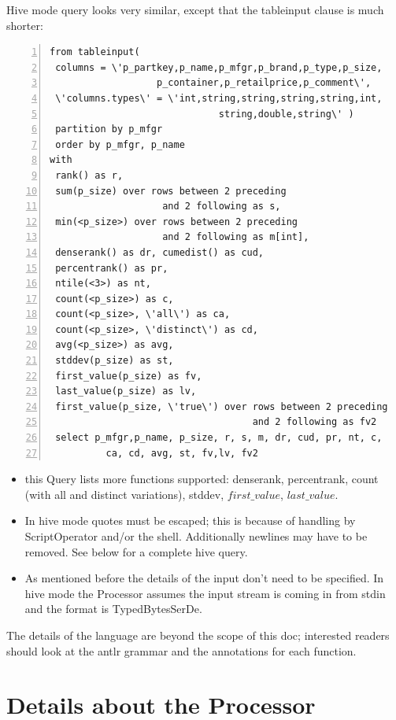 \documentclass[pdftex,10pt,a4paper]{article}
\begin{document}
  
  Hive mode query looks very similar, except that the tableinput clause is much shorter:
  {\small
   \lstset{keywordstyle=\bfseries\underbar, emphstyle=\underbar,
     language=SQL, showspaces=false, showstringspaces=false}
   \begin{lstlisting}[caption={A Hive mode Query},frame=shadowbox, numbers=left]
from tableinput(
 columns = \'p_partkey,p_name,p_mfgr,p_brand,p_type,p_size,
                   p_container,p_retailprice,p_comment\',
 \'columns.types\' = \'int,string,string,string,string,int,
                              string,double,string\' )
 partition by p_mfgr 
 order by p_mfgr, p_name 
with 
 rank() as r, 
 sum(p_size) over rows between 2 preceding 
                    and 2 following as s, 
 min(<p_size>) over rows between 2 preceding 
                    and 2 following as m[int], 
 denserank() as dr, cumedist() as cud, 
 percentrank() as pr, 
 ntile(<3>) as nt, 
 count(<p_size>) as c, 
 count(<p_size>, \'all\') as ca, 
 count(<p_size>, \'distinct\') as cd, 
 avg(<p_size>) as avg, 
 stddev(p_size) as st, 
 first_value(p_size) as fv, 
 last_value(p_size) as lv, 
 first_value(p_size, \'true\') over rows between 2 preceding 
                                    and 2 following as fv2 
 select p_mfgr,p_name, p_size, r, s, m, dr, cud, pr, nt, c, 
          ca, cd, avg, st, fv,lv, fv2
   \end{lstlisting}
   }
  
   \begin{itemize}
   \item this Query lists more functions supported: denserank, percentrank, count (with all and distinct variations), stddev, $first\_value$, $last\_value$.
   \item In hive mode quotes must be escaped; this is because of handling by ScriptOperator and/or the shell. Additionally newlines may have to be removed. See below for a complete hive query.
   \item As mentioned before the details of the input don't need to be specified. In hive mode the Processor assumes the input stream is coming in from stdin and the format is TypedBytesSerDe.
   \end{itemize}
   
   The details of the language are beyond the scope of this doc; interested readers should look at the antlr grammar and the annotations for each function.
   
   \section{Details about the Processor}
   
\end{document}
